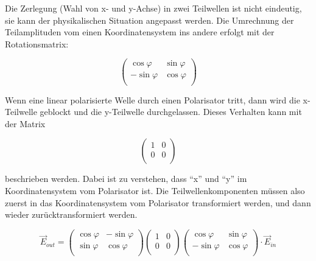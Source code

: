 Die Zerlegung (Wahl von x- und y-Achse) in  zwei Teilwellen ist nicht eindeutig,
sie  kann  der  physikalischen  Situation angepasst werden. Die  Umrechnung  der
Teilamplituden  vom  einen  Koordinatensystem   ins   andere   erfolgt  mit  der
Rotationsmatrix:

\begin{equation}
    \begin{pmatrix}
        \cos\varphi  & \sin\varphi \\
        -\sin\varphi & \cos\varphi \\
    \end{pmatrix}
\end{equation}

Wenn eine linear polarisierte Welle durch einen Polarisator tritt, dann wird die
x-Teilwelle geblockt und die  y-Teilwelle  durchgelassen.  Dieses Verhalten kann
mit der Matrix

\begin{equation}
    \begin{pmatrix}
        1 & 0 \\ 0 & 0 \\
    \end{pmatrix}
\end{equation}

beschrieben   werden.   Dabei   ist  zu  verstehen,  dass  ``x''  und  ``y''  im
Koordinatensystem vom Polarisator ist.  Die  Teilwellenkomponenten m\"ussen also
zuerst in das Koordinatensystem vom Polarisator transformiert werden,  und  dann
wieder zur\"ucktransformiert werden.

\begin{equation}
    \vec{E}_{out} = \begin{pmatrix}
        \cos\varphi & -\sin\varphi \\
        \sin\varphi &  \cos\varphi \\
    \end{pmatrix}\begin{pmatrix}
        1 & 0 \\ 0 & 0 \\
    \end{pmatrix}\begin{pmatrix}
        \cos\varphi  & \sin\varphi \\
        -\sin\varphi & \cos\varphi \\
    \end{pmatrix} \cdot\vec{E}_{in}
    \label{eq:polarisator}
\end{equation}


